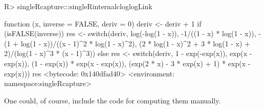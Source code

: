 \documentclass[
]{jss}
\newcommand{\1}{\mathcal{I}} \newcommand{\bZero}{\boldsymbol{0}}
\begin{document}
\begin{CodeChunk}
\begin{CodeInput}
R> singleRcapture:::singleRinternalcloglogLink
\end{CodeInput}
\begin{CodeOutput}
function (x, inverse = FALSE, deriv = 0) 
{
    deriv <- deriv + 1
    if (isFALSE(inverse)) {
        res <- switch(deriv, log(-log(1 - x)), -1/((1 - x) * 
            log(1 - x)), -(1 + log(1 - x))/((x - 1)^2 * log(1 - 
            x)^2), (2 * log(1 - x)^2 + 3 * log(1 - x) + 2)/(log(1 - 
            x)^3 * (x - 1)^3))
    }
    else {
        res <- switch(deriv, 1 - exp(-exp(x)), exp(x - exp(x)), 
            (1 - exp(x)) * exp(x - exp(x)), (exp(2 * x) - 3 * 
                exp(x) + 1) * exp(x - exp(x)))
    }
    res
}
<bytecode: 0x140dfad40>
<environment: namespace:singleRcapture>
\end{CodeOutput}
\end{CodeChunk}

\normalsize

One could, of course, include the code for computing them manually.


\end{document}
